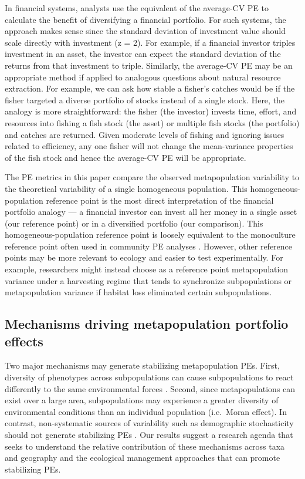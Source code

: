 In financial systems, analysts use the equivalent of the average-CV PE to
calculate the benefit of diversifying a financial portfolio. For such systems,
the approach makes sense since the standard deviation of investment value should
scale directly with investment (z = 2). For example, if a financial investor
triples investment in an asset, the investor can expect the standard deviation
of the returns from that investment to triple. Similarly, the average-CV PE may
be an appropriate method if applied to analogous questions about natural
resource extraction. For example, we can ask how stable a fisher's catches would
be if the fisher targeted a diverse portfolio of stocks instead of a single
stock. Here, the analogy is more straightforward: the fisher (the investor)
invests time, effort, and resources into fishing a fish stock (the asset) or
multiple fish stocks (the portfolio) and catches are returned. Given moderate
levels of fishing and ignoring issues related to efficiency, any one fisher
will not change the mean-variance properties of the fish stock and hence the
average-CV PE will be appropriate.

The PE metrics in this paper compare the observed metapopulation variability to
the theoretical variability of a single homogeneous population. This
homogeneous-population reference point is the most direct interpretation of the
financial portfolio analogy --- a financial investor can invest all her money
in a single asset (our reference point) or in a diversified portfolio (our
comparison). This homogeneous-population reference point is loosely equivalent
to the monoculture reference point often used in community PE analyses
\citep[e.g. Equation 7 in][]{thibaut2013}. However, other reference points
may be more relevant to ecology and easier to test experimentally. For example,
researchers might instead choose as a reference point metapopulation variance
under a harvesting regime that tends to synchronize subpopulations or
metapopulation variance if habitat loss eliminated certain subpopulations.

\subsection{Mechanisms driving metapopulation portfolio effects}

Two major mechanisms may generate stabilizing metapopulation PEs.
First, diversity of phenotypes across subpopulations can cause subpopulations
to react differently to the same environmental forces \citep[response
diversity;][]{elmqvist2003}. Second, since metapopulations can exist over
a large area, subpopulations may experience a greater diversity of
environmental conditions than an individual population (i.e.\ Moran effect). In
contrast, non-systematic sources of variability such as demographic
stochasticity should not generate stabilizing PEs \citep{loreau2008}. Our
results suggest a research agenda that seeks to understand the relative
contribution of these mechanisms across taxa and geography and the ecological
management approaches that can promote stabilizing PEs.

